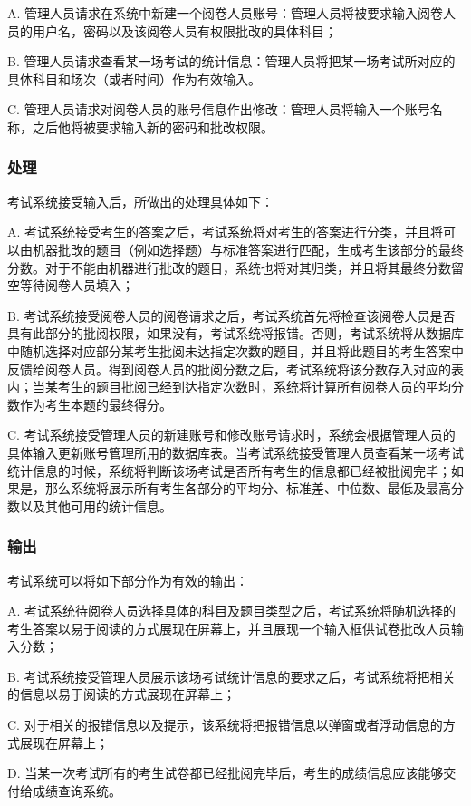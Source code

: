 A. 管理人员请求在系统中新建一个阅卷人员账号：管理人员将被要求输入阅卷人员的用户名，密码以及该阅卷人员有权限批改的具体科目；

B. 管理人员请求查看某一场考试的统计信息：管理人员将把某一场考试所对应的具体科目和场次（或者时间）作为有效输入。

C. 管理人员请求对阅卷人员的账号信息作出修改：管理人员将输入一个账号名称，之后他将被要求输入新的密码和批改权限。

\subsubsection{处理}
考试系统接受输入后，所做出的处理具体如下：

A. 考试系统接受考生的答案之后，考试系统将对考生的答案进行分类，并且将可以由机器批改的题目（例如选择题）与标准答案进行匹配，生成考生该部分的最终分数。对于不能由机器进行批改的题目，系统也将对其归类，并且将其最终分数留空等待阅卷人员填入；

B. 考试系统接受阅卷人员的阅卷请求之后，考试系统首先将检查该阅卷人员是否具有此部分的批阅权限，如果没有，考试系统将报错。否则，考试系统将从数据库中随机选择对应部分某考生批阅未达指定次数的题目，并且将此题目的考生答案中反馈给阅卷人员。得到阅卷人员的批阅分数之后，考试系统将该分数存入对应的表内；当某考生的题目批阅已经到达指定次数时，系统将计算所有阅卷人员的平均分数作为考生本题的最终得分。

C. 考试系统接受管理人员的新建账号和修改账号请求时，系统会根据管理人员的具体输入更新账号管理所用的数据库表。当考试系统接受管理人员查看某一场考试统计信息的时候，系统将判断该场考试是否所有考生的信息都已经被批阅完毕；如果是，那么系统将展示所有考生各部分的平均分、标准差、中位数、最低及最高分数以及其他可用的统计信息。

\subsubsection{输出}
考试系统可以将如下部分作为有效的输出：

A. 考试系统待阅卷人员选择具体的科目及题目类型之后，考试系统将随机选择的考生答案以易于阅读的方式展现在屏幕上，并且展现一个输入框供试卷批改人员输入分数；

B. 考试系统接受管理人员展示该场考试统计信息的要求之后，考试系统将把相关的信息以易于阅读的方式展现在屏幕上；

C. 对于相关的报错信息以及提示，该系统将把报错信息以弹窗或者浮动信息的方式展现在屏幕上；

D. 当某一次考试所有的考生试卷都已经批阅完毕后，考生的成绩信息应该能够交付给成绩查询系统。

